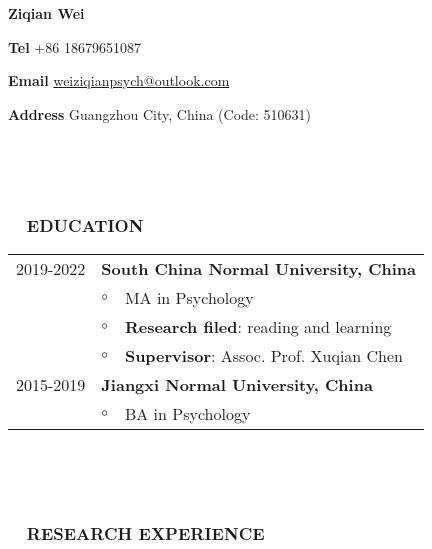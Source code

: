 \documentclass[a4paper, 12pt]{article}
\begin{document}

\centerline{\large\bf Ziqian Wei}
\centerline{\textbf{Tel} +86 18679651087}
\centerline{\textbf{Email} \href{mailto: weiziqianpsych@outlook.com}{weiziqianpsych@outlook.com}}
\centerline{\textbf{Address} Guangzhou City, China (Code: 510631)}

\  \par 
\  \par 

\subsubsection*{ \ \ EDUCATION}


\begin{tabularx}{\textwidth}{p{2cm} p{0.1cm} X}

    2019-2022 & \multicolumn{2}{X}{\textbf{South China Normal University, China}} \\
    & $\circ$ & MA in Psychology \\
    & $\circ$ & \textbf{Research filed}: reading and learning \\
    & $\circ$ & \textbf{Supervisor}: Assoc. Prof. Xuqian Chen \\

    2015-2019 & \multicolumn{2}{X}{\textbf{Jiangxi Normal University, China}} \\
    & $\circ$ & BA in Psychology \\
    
    \end{tabularx}



\  \par 
\  \par 


\subsubsection*{ \ \ RESEARCH EXPERIENCE}
\end{document}
